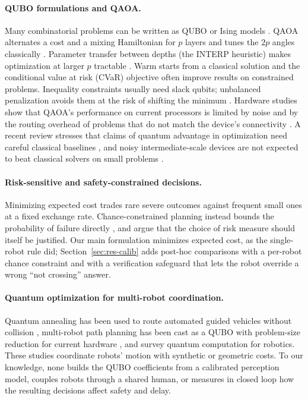\documentclass[a4paper,fleqn]{cas-dc}
\begin{document}
\paragraph{QUBO formulations and QAOA.}
Many combinatorial problems can be written as QUBO or Ising models \citep{lucas2014ising,glover2019qubo}. QAOA alternates a cost and a mixing Hamiltonian for $p$ layers and tunes the $2p$ angles classically \citep{farhi2014qaoa}. Parameter transfer between depths (the INTERP heuristic) makes optimization at larger $p$ tractable \citep{zhou2020qaoa}. Warm starts from a classical solution \citep{egger2021warm} and the conditional value at risk (CVaR) objective \citep{barkoutsos2020cvar} often improve results on constrained problems. Inequality constraints usually need slack qubits; unbalanced penalization avoids them at the risk of shifting the minimum \citep{montanez2024unbalanced}. Hardware studies show that QAOA's performance on current processors is limited by noise and by the routing overhead of problems that do not match the device's connectivity \citep{harrigan2021qaoa}. A recent review stresses that claims of quantum advantage in optimization need careful classical baselines \citep{abbas2024challenges}, and noisy intermediate-scale devices are not expected to beat classical solvers on small problems \citep{preskill2018nisq}.

\paragraph{Risk-sensitive and safety-constrained decisions.}
Minimizing expected cost trades rare severe outcomes against frequent small ones at a fixed exchange rate. Chance-constrained planning instead bounds the probability of failure directly \citep{blackmore2011chance}, and \citet{majumdar2020risk} argue that the choice of risk measure should itself be justified. Our main formulation minimizes expected cost, as the single-robot rule did; Section~\ref{sec:res-calib} adds post-hoc comparisons with a per-robot chance constraint and with a verification safeguard that lets the robot override a wrong ``not crossing'' answer.

\paragraph{Quantum optimization for multi-robot coordination.}
Quantum annealing has been used to route automated guided vehicles without collision \citep{ohzeki2019agv}, multi-robot path planning has been cast as a QUBO with problem-size reduction for current hardware \citep{gonzalez2026qubopath}, and \citet{petschnigg2019quantum} survey quantum computation for robotics. These studies coordinate robots' motion with synthetic or geometric costs. To our knowledge, none builds the QUBO coefficients from a calibrated perception model, couples robots through a shared human, or measures in closed loop how the resulting decisions affect safety and delay.
\end{document}
